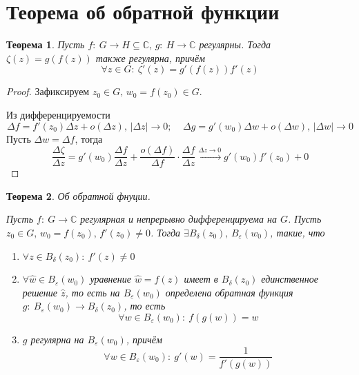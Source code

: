 \documentclass[a4paper,12pt]{article}
\theoremstyle{plain}
\newtheorem{theorem}{Теорема}[section]
\theoremstyle{definition}
\theoremstyle{remark}
\begin{document}
\section{Теорема об обратной функции}
\begin{theorem}
	Пусть $f :\: G \to H \subseteq \mathbb{C},\, g :\: H \to \mathbb{C}$ регулярны. Тогда $\zeta(z) = g(f(z))$ также регулярна, причём
	\[
		\forall z \in G :\: \zeta'(z) = g'(f(z))f'(z)
	\]
\end{theorem}

\begin{proof}
	Зафиксируем $z_0 \in G,\, w_0 = f(z_0) \in G$.

	Из дифференцируемости
	\[
		\Delta f = f'(z_0)\Delta z + o(\Delta z),\, \vert\Delta z\vert \to 0;\;\;\;\; \Delta g = g'(w_0)\Delta w + o(\Delta w),\, \vert\Delta w\vert \to 0
	\]
	Пусть $\Delta w = \Delta f$, тогда
	\[
		\frac{\Delta\zeta}{\Delta z} = g'(w_0)\frac{\Delta f}{\Delta z} + \frac{o(\Delta f)}{\Delta f}\cdot\frac{\Delta f}{\Delta z} \overset{\Delta z \to 0}{\to} g'(w_0)f'(z_0) + 0
	\]
\end{proof}

\begin{theorem}
	Об обратной фнуции.

	Пусть $f :\: G \to \mathbb{C}$ регулярная и непрерывно дифференцируема на $G$. Пусть $z_0 \in G,\, w_0 = f(z_0),\, f'(z_0) \neq 0$. Тогда $\exists B_\delta(z_0),\, B_\varepsilon(w_0)$, такие, что
	\begin{enumerate}
		\item $\forall z \in B_\delta(z_0) :\: f'(z) \neq 0$
		\item $\forall \hat{w} \in B_\varepsilon(w_0)$ уравнение $\hat{w} = f(z)$ имеет в $B_\delta(z_0)$ единственное решение $\hat{z}$, то есть на $B_\varepsilon(w_0)$ определена обратная функция $g :\: B_\varepsilon(w_0) \to B_\delta(z_0)$, то есть
		      \[
			      \forall w \in B_\varepsilon(w_0) :\: f(g(w)) = w
		      \]
		\item $g$ регулярна на $B_\varepsilon(w_0)$, причём
		      \[
			      \forall w \in B_\varepsilon(w_0) :\: g'(w) = \frac{1}{f'(g(w))}
		      \]
	\end{enumerate}
\end{theorem}
\end{document}
